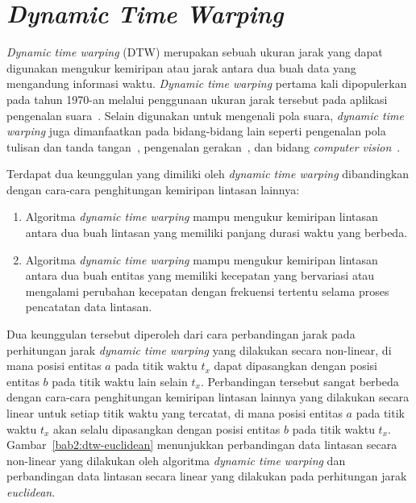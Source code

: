 \section{\textit{Dynamic Time Warping}}
\label{sec:dtw}

\textit{Dynamic time warping} (DTW) merupakan sebuah ukuran jarak yang dapat digunakan mengukur kemiripan atau jarak antara dua buah data yang mengandung informasi waktu. \textit{Dynamic time warping} pertama kali dipopulerkan pada tahun 1970-an melalui penggunaan ukuran jarak tersebut pada aplikasi pengenalan suara~\cite{myers:02:speech-recognition}. Selain digunakan untuk mengenali pola suara, \textit{dynamic time warping} juga dimanfaatkan pada bidang-bidang lain seperti pengenalan pola tulisan dan tanda tangan~\cite{efrat:02:handwriting}, pengenalan gerakan~\cite{corradini:02:gesture}, dan bidang \textit{computer vision}~\cite{muller:02:computer-vision}. 

Terdapat dua keunggulan yang dimiliki oleh \textit{dynamic time warping} dibandingkan dengan cara-cara penghitungan kemiripan lintasan lainnya:

\begin{enumerate}
    \item Algoritma \textit{dynamic time warping} mampu mengukur kemiripan lintasan antara dua buah lintasan yang memiliki panjang durasi waktu yang berbeda.
    \item Algoritma \textit{dynamic time warping} mampu mengukur kemiripan lintasan antara dua buah entitas yang memiliki kecepatan yang bervariasi atau mengalami perubahan kecepatan dengan frekuensi tertentu selama proses pencatatan data lintasan.
\end{enumerate}

Dua keunggulan tersebut diperoleh dari cara perbandingan jarak pada perhitungan jarak \textit{dynamic time warping} yang dilakukan secara non-linear, di mana posisi entitas $a$ pada titik waktu $t_x$ dapat dipasangkan dengan posisi entitas $b$ pada titik waktu lain selain $t_x$. Perbandingan tersebut sangat berbeda dengan cara-cara penghitungan kemiripan lintasan lainnya yang dilakukan secara linear untuk setiap titik waktu yang tercatat, di mana posisi entitas $a$ pada titik waktu $t_x$ akan selalu dipasangkan dengan posisi entitas $b$ pada titik waktu $t_x$. Gambar~\ref{bab2:dtw-euclidean} menunjukkan perbandingan data lintasan secara non-linear yang dilakukan oleh algoritma \textit{dynamic time warping} dan perbandingan data lintasan secara linear yang dilakukan pada perhitungan jarak \textit{euclidean}.

